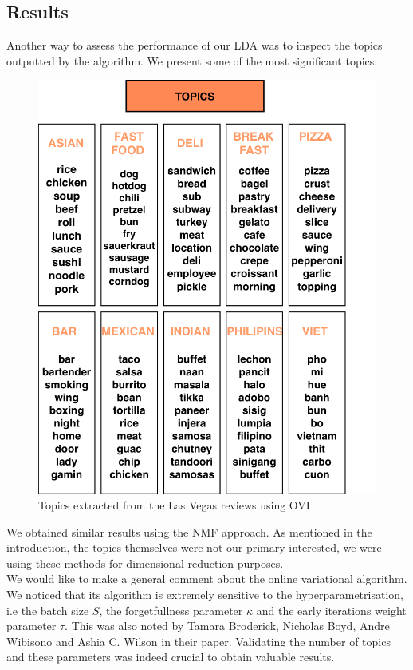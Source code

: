 \documentclass[twoside]{article}
\begin{document}
\begin{multicols}{2}
\subsection{Results}
Another way to assess the performance of our LDA was to inspect the topics outputted by the algorithm. We present some of the most significant topics:\\

\begin{figure}[H]
\centering
\includegraphics[width=1\linewidth]{img/topics.png}
\caption{Topics extracted from the Las Vegas reviews using OVI}
\end{figure} 

\noindent We obtained similar results using the NMF approach. As mentioned in the introduction, the topics themselves were not our primary interested, we were using these methods for dimensional reduction purposes. \\

We would like to make a general comment about the online variational algorithm. We noticed that its algorithm is extremely sensitive to the hyperparametrisation, i.e the batch size $S$, the forgetfullness parameter $\kappa$ and the early iterations weight parameter $\tau$. This was also noted by Tamara Broderick, Nicholas Boyd, Andre Wibisono and Ashia C. Wilson in their paper\cite{svi}. Validating the number of topics and these parameters was indeed crucial to obtain valuable results.\\


\end{multicols}
\end{document}

